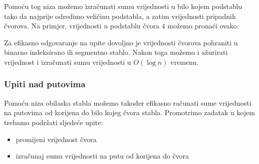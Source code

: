 Pomoću tog niza možemo izračunati sumu vrijednosti
u bilo kojem podstablu tako da najprije odredimo veličinu podstabla,
a zatim vrijednosti pripadnih čvorova.
Na primjer, vrijednosti u podstablu čvora $4$
možemo pronaći ovako:

\begin{center}
\end{center}

Za efikasno odgovaranje na upite
dovoljno je vrijednosti čvorova pohraniti
u binarno indeksirano ili segmentno stablo.
Nakon toga možemo i ažurirati vrijednost
i izračunati sumu vrijednosti u $O(\log n)$ vremenu.

\subsubsection{Upiti nad putovima}

Pomoću niza obilaska stabla možemo također efikasno
računati sume vrijednosti na
putovima od korijena do bilo kojeg
čvora stabla.
Promotrimo zadatak u kojem trebamo
podržati sljedeće upite:
\begin{itemize}
\item promijeni vrijednost čvora
\item izračunaj sumu vrijednosti na putu od
korijena do čvora
\end{itemize}

